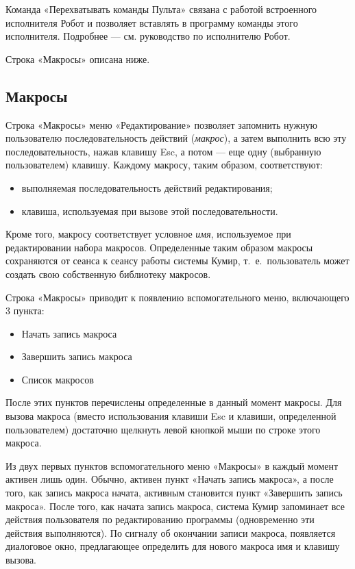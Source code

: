 \documentclass[12pt,a4paper]{article}
\begin{document}
Команда «Перехватывать команды Пульта» связана с работой встроенного исполнителя Робот и позволяет вставлять в программу команды этого исполнителя. Подробнее --- см. руководство по исполнителю Робот.

Строка «Макросы» описана ниже.

\subsection{Макросы}

Строка «Макросы» меню «Редактирование» позволяет запомнить нужную пользователю последовательность действий (\emph{макрос}), а затем выполнить всю эту последовательность, нажав клавишу \textsf{Esc}, а потом --- еще одну (выбранную пользователем) клавишу. Каждому макросу, таким образом, соответствуют:
\begin{itemize}
\item выполняемая последовательность действий редактирования;
\item клавиша, используемая при вызове этой последовательности.
\end{itemize}

Кроме того, макросу соответствует условное \emph{имя}, используемое при редактировании набора макросов. Определенные таким образом макросы сохраняются от сеанса к сеансу работы системы Кумир, т.~е.~пользователь может создать свою собственную библиотеку макросов. 

Строка «Макросы» приводит к появлению вспомогательного меню, включающего 3 пункта:
\begin{itemize}
\item Начать запись макроса
\item Завершить запись макроса
\item Список макросов
\end{itemize}

После этих пунктов перечислены определенные в данный момент макросы. Для вызова макроса (вместо использования клавиши \textsf{Esc} и клавиши, определенной пользователем) достаточно щелкнуть левой кнопкой мыши по строке этого макроса.

Из двух первых пунктов вспомогательного меню «Макросы» в каждый момент активен лишь один. Обычно, активен пункт «Начать запись макроса», а после того, как запись макроса начата, активным становится пункт «Завершить запись макроса». После того, как начата запись макроса, система Кумир запоминает все действия пользователя по редактированию программы (одновременно эти действия выполняются).  По сигналу об окончании записи макроса, появляется диалоговое окно, предлагающее определить для нового макроса имя и клавишу вызова. 
\end{document}
